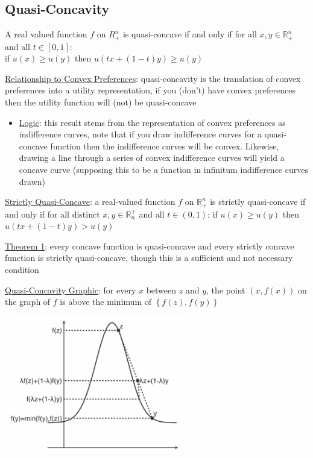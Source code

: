 \documentclass{article}
\begin{document}
\subsection{Quasi-Concavity}
A real valued function $f$ on $R_{+}^{n}$ is quasi-concave if and only if for all $x, y \in \mathbb{R}_{+}^{n}$ and all $t \in [0,1]$: \\ if $u(x) \geq u(y)$ then $u(tx + (1-t)y) \geq u(y)$ \par \vspace{0.3em}
  \underline{Relationship to Convex Preferences}: quasi-concavity is the translation of convex preferences into a utility representation, if you (don't) have convex preferences then the utility function will (not) be quasi-concave
  \begin{itemize}
    \item  \underline{Logic}: this result stems from the representation of convex preferences as indifference curves, note that if you draw indifference curves for a quasi-concave function then the indifference curves will be convex. Likewise, drawing a line through a series of convex indifference curves will yield a concave curve (supposing this to be a function in infinitum indifference curves drawn)
  \end{itemize}
  \par
  \underline{Strictly Quasi-Concave}: a real-valued function $f$ on $\mathbb{R}_{+}^{n}$ is strictly quasi-concave if and only if for all distinct $x, y \in \mathbb{R}^{+}_{n}$ and all $t \in (0,1)$: if $u(x) \geq u(y)$ then $u(tx + (1-t)y) > u(y)$
  \par
  \underline{Theorem 1}: every concave function is quasi-concave and every strictly concave function is strictly quasi-concave, though this is a sufficient and not necessary condition
  \par
  \underline{Quasi-Concavity Graphic}: for every $x$ between $z$ and $y$, the point $(x, f(x))$ on the graph of $f$ is above the minimum of $\left\{ f(z), f(y) \right\}$
  \begin{center}
    \includegraphics[width=8cm, height=6cm]{pic30}
  \end{center}
\end{document}
